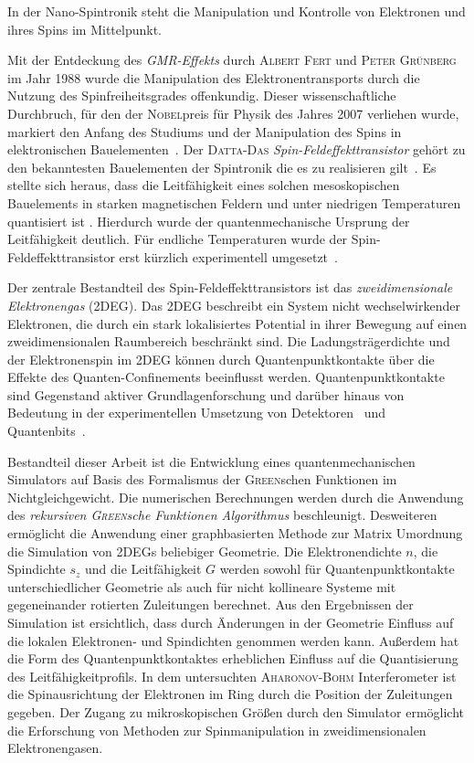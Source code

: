 In der Nano-Spintronik steht die Manipulation und Kontrolle von Elektronen und ihres Spins im Mittelpunkt.\par
Mit der Entdeckung des \emph{GMR-Effekts} durch \textsc{Albert Fert} und \textsc{Peter Gr\"unberg} im Jahr 1988 wurde die Manipulation des Elektronentransports durch die Nutzung des Spinfreiheitsgrades offenkundig. Dieser wissenschaftliche Durchbruch, f\"ur den der \textsc{Nobel}preis f\"ur Physik des Jahres 2007 verliehen wurde, markiert den Anfang des Studiums und der Manipulation des Spins in elektronischen Bauelementen~\cite{evegeny2010spin}. Der \textsc{Datta-Das} \emph{Spin-Feldeffekttransistor} geh\"ort zu den bekanntesten Bauelementen der Spintronik die es zu realisieren gilt~\cite{datta:665}. Es stellte sich heraus, dass die Leitf\"ahigkeit eines solchen mesoskopischen Bauelements in starken magnetischen Feldern und unter niedrigen Temperaturen quantisiert ist \cite{PhysRevLett.45.494}. Hierdurch wurde der quantenmechanische Ursprung der Leitf\"ahigkeit deutlich. F\"ur endliche Temperaturen wurde der Spin-Feldeffekttransistor erst k\"urzlich experimentell umgesetzt~\cite{Wunderlich24122010}.\par
Der zentrale Bestandteil des Spin-Feldeffekttransistors ist das \emph{zweidimensionale Elektronengas} (2DEG). Das 2DEG beschreibt ein System nicht wechselwirkender Elektronen, die durch ein stark lokalisiertes Potential in ihrer Bewegung auf einen zweidimensionalen Raumbereich beschr\"ankt sind. Die Ladungstr\"agerdichte und der Elektronenspin im 2DEG k\"onnen durch Quantenpunktkontakte \"uber die Effekte des Quanten-Confinements beeinflusst werden. Quantenpunktkontakte sind Gegenstand aktiver Grund\-la\-gen\-for\-schung und dar\"uber hinaus von Bedeutung in der experimentellen Umsetzung von Detektoren~\cite{PhysRevB.67.161308} und Quantenbits~\cite{PhysRevA.57.120}.\par
Bestandteil dieser Arbeit ist die Entwicklung eines quantenmechanischen Simulators auf Basis des Formalismus der \textsc{Green}schen Funktionen im Nichtgleichgewicht. Die numerischen Berechnungen werden durch die Anwendung des \emph{rekursiven \textsc{Green}sche Funktionen Algorithmus} beschleunigt. Desweiteren erm\"oglicht die Anwendung einer graphbasierten Methode zur Matrix Umordnung die Simulation von 2DEGs beliebiger Geometrie. Die Elektronendichte $n$, die Spindichte $s_z$ und die Leitf\"ahigkeit $G$ werden sowohl f\"ur Quantenpunktkontakte unterschiedlicher Geometrie als auch f\"ur nicht kollineare Systeme mit gegeneinander rotierten Zuleitungen berechnet. Aus den Ergebnissen der Simulation ist ersichtlich, dass durch \"Anderungen in der Geometrie Einfluss auf die lokalen Elektronen- und Spindichten genommen werden kann. Au\ss erdem hat die Form des Quantenpunktkontaktes erheblichen Einfluss auf die Quantisierung des Leitf\"ahigkeitprofils. In dem untersuchten \textsc{Aharonov-Bohm} Interferometer ist die Spinausrichtung der Elektronen im Ring durch die Position der Zuleitungen gegeben. Der Zugang zu mikroskopischen Gr\"o\ss en durch den Simulator erm\"oglicht die Erforschung von Methoden zur Spinmanipulation in zweidimensionalen Elektronengasen.
